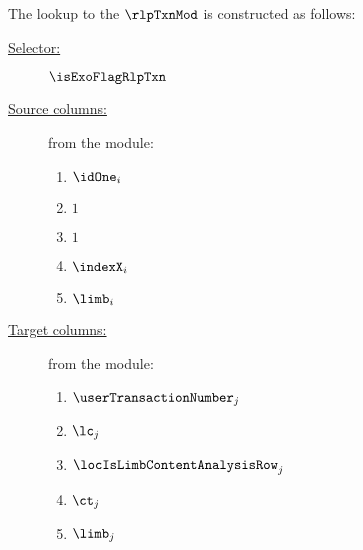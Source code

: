The lookup to the $\rlpTxnMod$ is constructed as follows:
\begin{description}
	\item[\underline{Selector:}] $\isExoFlagRlpTxn$
	\item[\underline{Source columns:}] from the \mmioMod{} module:
		\begin{multicols}{3}
			\begin{enumerate}
				\item $\idOne_{i}$
				\item $1$
				\item $1$
				\item $\indexX_{i}$
				\item $\limb_{i}$
			\end{enumerate}
		\end{multicols}
	\item[\underline{Target columns:}] from the \rlpTxnMod{} module: 
		\begin{multicols}{3}
			\begin{enumerate}
				\item $\userTransactionNumber   		_{j}$
				\item $\lc        						_{j}$
				\item $\locIsLimbContentAnalysisRow 	_{j}$
				\item $\ct        						_{j}$
				\item $\limb      						_{j}$
			\end{enumerate}
		\end{multicols}
\end{description}
